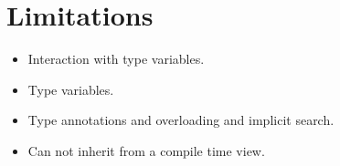 \section{Limitations}
\label{sct:limitations}

\begin{itemize}
\item Interaction with type variables.
\item Type variables.
\item Type annotations and overloading and implicit search.
\item Can not inherit from a compile time view.
\end{itemize}
